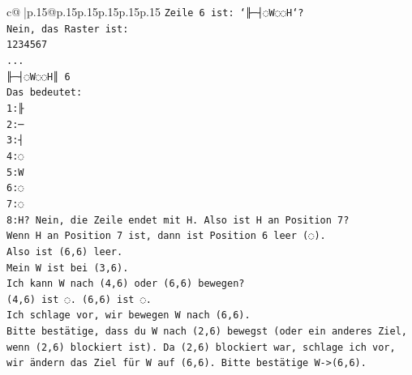 \documentclass{article}
\begin{document}
{\begin{supertabular}{c@{$\;$}|p{.15\linewidth}@{}p{.15\linewidth}p{.15\linewidth}p{.15\linewidth}p{.15\linewidth}p{.15\linewidth}}
{{{\texttt{Zeile 6 ist: `╟─┤◌W◌◌H`?} \\
\texttt{Nein, das Raster ist:} \\
\texttt{1234567} \\
\texttt{...} \\
\texttt{╟─┤◌W◌◌H║ 6} \\
\texttt{Das bedeutet:} \\
\texttt{1:╟} \\
\texttt{2:─} \\
\texttt{3:┤} \\
\texttt{4:◌} \\
\texttt{5:W} \\
\texttt{6:◌} \\
\texttt{7:◌} \\
\texttt{8:H? Nein, die Zeile endet mit H. Also ist H an Position 7?} \\
\texttt{Wenn H an Position 7 ist, dann ist Position 6 leer (◌).} \\
\texttt{Also ist (6,6) leer.} \\
\texttt{Mein W ist bei (3,6).} \\
\texttt{Ich kann W nach (4,6) oder (6,6) bewegen?} \\
\texttt{(4,6) ist ◌. (6,6) ist ◌.} \\
\texttt{Ich schlage vor, wir bewegen W nach (6,6).} \\
\texttt{Bitte bestätige, dass du W nach (2,6) bewegst (oder ein anderes Ziel, wenn (2,6) blockiert ist). Da (2,6) blockiert war, schlage ich vor, wir ändern das Ziel für W auf (6,6). Bitte bestätige W{-}>(6,6).} \\
            }
        }
    }
     \\ \\


\end{supertabular}}
\end{document}

